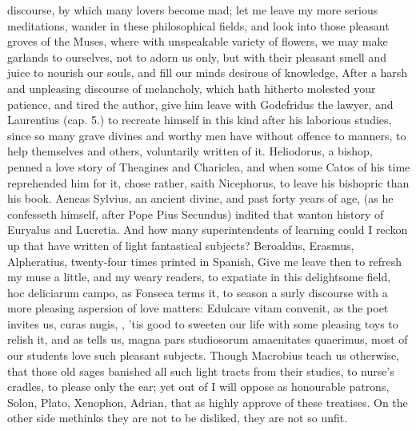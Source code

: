 {discourse, by which many lovers become mad; let me leave my more
serious meditations, wander in these philosophical fields, and look
into those pleasant groves of the Muses, where with unspeakable variety
of flowers, we may make garlands to ourselves, not to adorn us only,
but with their pleasant smell and juice to nourish our souls, and fill
our minds desirous of knowledge, \etc{} After a harsh and unpleasing
discourse of melancholy, which hath hitherto molested your patience,
and tired the author, give him leave with Godefridus the lawyer,
and Laurentius (cap. 5.) to recreate himself in this kind after his
laborious studies, since so many grave divines and worthy men have
without offence to manners, to help themselves and others, voluntarily
written of it. Heliodorus, a bishop, penned a love story of Theagines
and Chariclea, and when some Catos of his time reprehended him for it,
chose rather, saith Nicephorus, to leave his bishopric than his
book. Aeneas Sylvius, an ancient divine, and past forty years of age,
(as he confesseth himself, after Pope Pius Secundus) indited that
wanton history of Euryalus and Lucretia. And how many superintendents
of learning could I reckon up that have written of light fantastical
subjects? Beroaldus, Erasmus, Alpheratius, twenty-four times printed in
Spanish, \etc{} Give me leave then to refresh my muse a little, and my
weary readers, to expatiate in this delightsome field, hoc deliciarum
campo, as Fonseca terms it, to  season a surly discourse with a
more pleasing aspersion of love matters: Edulcare vitam convenit, as
the poet invites us, curas nugis, \etc{}, 'tis good to sweeten our life
with some pleasing toys to relish it, and as \Pliny{} tells us, magna pars
studiosorum amaenitates quaerimus, most of our students love such
pleasant subjects. Though Macrobius teach us otherwise,
that those old sages banished all such light tracts from their
studies, to nurse's cradles, to please only the ear; yet out of
\Apuleius I will oppose as honourable patrons, Solon, Plato, 
Xenophon, Adrian, \etc{} that as highly approve of these treatises. On the
other side methinks they are not to be disliked, they are not so unfit.

}
